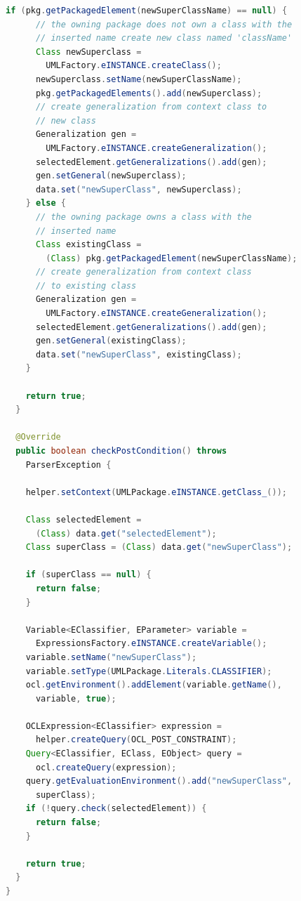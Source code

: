 \documentclass{llncs}
\begin{document}
\begin{lstlisting}[language=Java,caption=Source code of the \textit{extract superClass} refactoring,label=lst:extractSuperclass]
    if (pkg.getPackagedElement(newSuperClassName) == null) {
      // the owning package does not own a class with the 
      // inserted name create new class named 'className'
      Class newSuperclass = 
        UMLFactory.eINSTANCE.createClass();
      newSuperclass.setName(newSuperClassName);
      pkg.getPackagedElements().add(newSuperclass);
      // create generalization from context class to 
      // new class
      Generalization gen = 
        UMLFactory.eINSTANCE.createGeneralization();
      selectedElement.getGeneralizations().add(gen);
      gen.setGeneral(newSuperclass);
      data.set("newSuperClass", newSuperclass);
    } else { 
      // the owning package owns a class with the 
      // inserted name
      Class existingClass = 
        (Class) pkg.getPackagedElement(newSuperClassName);
      // create generalization from context class 
      // to existing class
      Generalization gen = 
        UMLFactory.eINSTANCE.createGeneralization();
      selectedElement.getGeneralizations().add(gen);
      gen.setGeneral(existingClass);
      data.set("newSuperClass", existingClass);
    }

    return true;
  }

  @Override
  public boolean checkPostCondition() throws 
    ParserException {
    
    helper.setContext(UMLPackage.eINSTANCE.getClass_());

    Class selectedElement = 
      (Class) data.get("selectedElement");
    Class superClass = (Class) data.get("newSuperClass");

    if (superClass == null) {
      return false;
    }

    Variable<EClassifier, EParameter> variable = 
      ExpressionsFactory.eINSTANCE.createVariable();
    variable.setName("newSuperClass");
    variable.setType(UMLPackage.Literals.CLASSIFIER);
    ocl.getEnvironment().addElement(variable.getName(), 
      variable, true);

    OCLExpression<EClassifier> expression = 
      helper.createQuery(OCL_POST_CONSTRAINT);
    Query<EClassifier, EClass, EObject> query = 
      ocl.createQuery(expression);
    query.getEvaluationEnvironment().add("newSuperClass", 
      superClass);
    if (!query.check(selectedElement)) {
      return false;
    }

    return true;
  }
}
\end{lstlisting}
\end{document}
